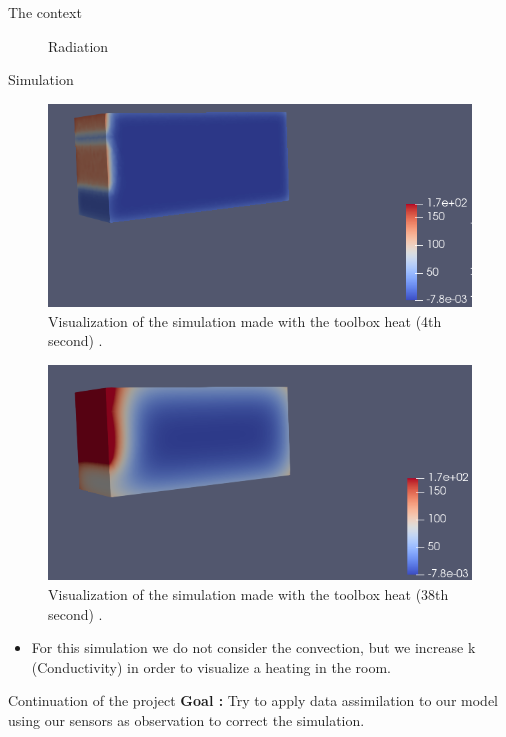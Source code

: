 \begin{frame}[allowframebreaks]{The context}
\begin{minipage}{0.35\linewidth}
\begin{figure}
        \caption{Radiation}
    \end{figure}
\end{minipage}

\end{frame}
\begin{frame}[allowframebreaks]{Simulation}
\begin{minipage}{0.48\linewidth}
    \begin{figure}
        \centering
        \includegraphics[width=\linewidth]{"images/enkf/Simulation_1.jpg"}
        \caption{Visualization of the simulation made with the toolbox heat (4th second) .}
    \end{figure}
\end{minipage} \;
\begin{minipage}{0.46\linewidth}
    \begin{figure}
        \centering
        \includegraphics[width=\linewidth]{"images/enkf/Simulation_2.jpg"}
        \caption{Visualization of the simulation made with the toolbox heat (38th second) .}
    \end{figure}
\end{minipage}
\begin{itemize}
    \item For this simulation we do not consider the convection, but we increase k (Conductivity) in order to visualize a heating in the room.
\end{itemize}

\end{frame}
    
\begin{frame}{Continuation of the project}
	\textbf{Goal :} Try to apply data assimilation to our model using our sensors as observation to correct the simulation.
\end{frame}



